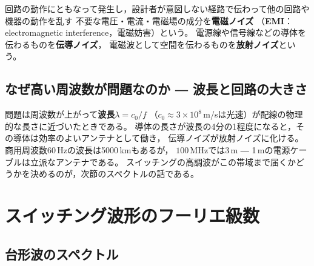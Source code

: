 \begin{定義}[電磁ノイズ]
\label{def11.1}
回路の動作にともなって発生し，設計者が意図しない経路で伝わって他の回路や機器の動作を乱す
不要な電圧・電流・電磁場の成分を\textbf{電磁ノイズ}
（\textbf{EMI}：electromagnetic interference，電磁妨害）という。
電源線や信号線などの導体を伝わるものを\textbf{伝導ノイズ}，
電磁波として空間を伝わるものを\textbf{放射ノイズ}という。
\end{定義}

\subsection{なぜ高い周波数が問題なのか ― 波長と回路の大きさ}

問題は周波数が上がって\textbf{波長}$\lambda = c_0/f$
（$c_0 \approx 3\times10^8$\,m/sは光速）が配線の物理的な長さに近づいたときである。
導体の長さが波長の4分の1程度になると，その導体は効率のよいアンテナとして働き，
伝導ノイズが放射ノイズに化ける。商用周波数60\,Hzの波長は5000\,kmもあるが，
$100$\,MHzでは3\,m ― 1\,mの電源ケーブルは立派なアンテナである。
スイッチングの高調波がこの帯域まで届くかどうかを決めるのが，次節のスペクトルの話である。


\section{スイッチング波形のフーリエ級数}
\label{sec11.2}


\subsection{台形波のスペクトル}

